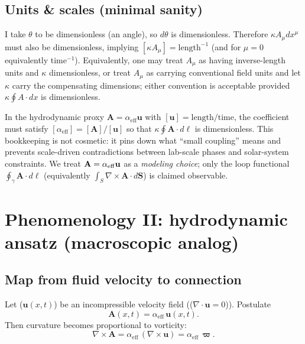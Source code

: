 ﻿\documentclass[twocolumn,aps,prd,nofootinbib]{revtex4-2}
\begin{document}
\subsection{Units \& scales (minimal sanity)}
I take $\theta$ to be dimensionless (an angle), so $d\theta$ is dimensionless. Therefore $\kappa A_\mu dx^\mu$ must also be dimensionless, implying $[\kappa A_\mu]=\mathrm{length}^{-1}$ (and for $\mu=0$ equivalently time$^{-1}$).
Equivalently, one may treat $A_\mu$ as having inverse-length units and $\kappa$ dimensionless, or treat $A_\mu$ as carrying conventional field units and let $\kappa$ carry the compensating dimensions; either convention is acceptable provided $\kappa\oint A\cdot dx$ is dimensionless.

In the hydrodynamic proxy $\mathbf A=\alpha_{\mathrm{eff}}\mathbf u$ with $[\mathbf u]=\mathrm{length}/\mathrm{time}$, the coefficient must satisfy $[\alpha_{\mathrm{eff}}]=[\mathbf A]/[\mathbf u]$ so that $\kappa\oint \mathbf A\cdot d\boldsymbol{\ell}$ is dimensionless. This bookkeeping is not cosmetic: it pins down what ``small coupling'' means and prevents scale-driven contradictions between lab-scale phases and solar-system constraints. We treat $\mathbf A=\alpha_{\rm eff}\mathbf u$ as a \emph{modeling choice}; only the loop functional $\oint_\gamma \mathbf A\cdot d\boldsymbol{\ell}$ (equivalently $\int_S \nabla\times\mathbf A\cdot d\mathbf S$) is claimed observable.





\section{Phenomenology II: hydrodynamic ansatz (macroscopic analog)}

\subsection{Map from fluid velocity to connection}
Let ($\mathbf{u}(x,t)$) be an incompressible velocity field (($\nabla\cdot\mathbf{u}=0$)). Postulate
\begin{equation}
\mathbf{A}(x,t) = \alpha_{\mathrm{eff}}\,\mathbf{u}(x,t).
\end{equation}
Then curvature becomes proportional to vorticity:
\begin{equation}
\nabla\times\mathbf{A} = \alpha_{\mathrm{eff}}\,(\nabla\times\mathbf{u}) = \alpha_{\mathrm{eff}}\,\boldsymbol{\varpi}.
\end{equation}
\end{document}
